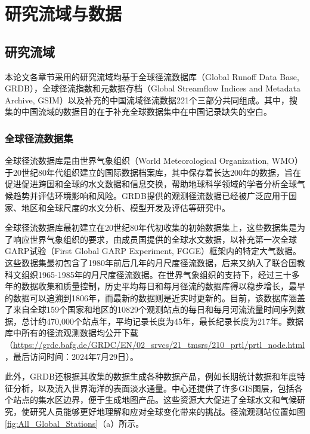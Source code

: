 \chapter{研究流域与数据}
\label{chap:data_and_All_Global_Stations}

\section{研究流域}

本论文各章节采用的研究流域均基于全球径流数据库（Global Runoff Data Base, GRDB），全球径流指数和元数据存档（Global Streamflow Indices and Metadata Archive, GSIM）以及补充的中国流域径流数据221个三部分共同组成。其中，搜集的中国流域的数据目的在于补充全球数据集中在中国记录缺失的空白。

\subsection{全球径流数据集}

全球径流数据库是由世界气象组织（World Meteorological Organization, WMO）于20世纪80年代组织建立的国际数据档案库，其中保存着长达200年的数据，旨在促进促进跨国和全球的水文数据和信息交换，帮助地球科学领域的学者分析全球气候趋势并评估环境影响和风险。GRDB提供的观测径流数据已经被广泛应用于国家、地区和全球尺度的水文分析、模型开发及评估等研究中\cite{burekUseGRDCGauging2023, houGlobalEvaluationRunoff2023}。\par
全球径流数据库最初建立在20世纪80年代初收集的初始数据集上，这些数据集是为了响应世界气象组织的要求，由成员国提供的全球水文数据，以补充第一次全球GARP试验（First Global GARP Experiment, FGGE）框架内的特定大气数据。这些数据集最初包含了1980年前后几年的月尺度径流数据，后来又纳入了联合国教科文组织1965-1985年的月尺度径流数据。在世界气象组织的支持下，经过三十多年的数据收集和质量控制，历史平均每日和每月径流的数据库得以稳步增长，最早的数据可以追溯到1806年，而最新的数据则是近实时更新的。目前，该数据库涵盖了来自全球159个国家和地区的10829个观测站点的每日和每月河流流量时间序列数据，总计约470,000个站点年，平均记录长度为45年，最长纪录长度为217年。数据库中所有的径流观测数据均公开下载（\href{https://grdc.bafg.de/GRDC/EN/02_srvcs/21_tmsrs/210_prtl/prtl_node.html}{https://grdc.bafg.de/GRDC/EN/02\_srvcs/21\_tmsrs/210\_prtl/prtl\_node.html}，最后访问时间：2024年7月29日）。\par
此外，GRDB还根据其收集的数据生成各种数据产品，例如长期统计数据和年度特征分析，以及流入世界海洋的表面淡水通量。中心还提供了许多GIS图层，包括各个站点的集水区边界，便于生成地图产品。这些资源大大促进了全球水文和气候研究，使研究人员能够更好地理解和应对全球变化带来的挑战。径流观测站位置如图\ref{fig:All_Global_Stations}（a）所示。\par

